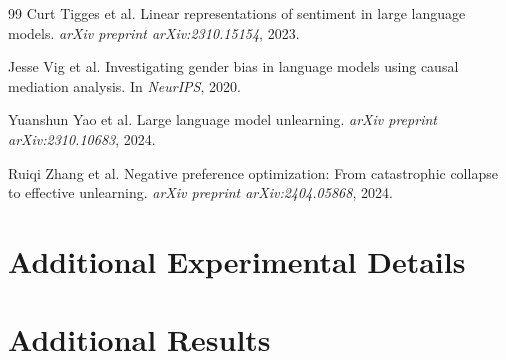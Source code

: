 \documentclass{article}
\begin{document}
\begin{thebibliography}{99}
Curt Tigges et al.
\newblock Linear representations of sentiment in large language models.
\newblock \emph{arXiv preprint arXiv:2310.15154}, 2023.

Jesse Vig et al.
\newblock Investigating gender bias in language models using causal mediation analysis.
\newblock In \emph{NeurIPS}, 2020.

Yuanshun Yao et al.
\newblock Large language model unlearning.
\newblock \emph{arXiv preprint arXiv:2310.10683}, 2024.

Ruiqi Zhang et al.
\newblock Negative preference optimization: From catastrophic collapse to effective unlearning.
\newblock \emph{arXiv preprint arXiv:2404.05868}, 2024.

\end{thebibliography}

\appendix
\section{Additional Experimental Details}
\label{app:details}

\section{Additional Results}
\label{app:results}
\end{document}
